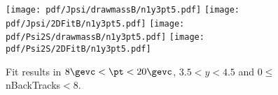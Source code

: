 \begin{figure}[H]
\begin{center}
\texttt{[image: pdf/Jpsi/drawmassB/n1y3pt5.pdf]}
\texttt{[image: pdf/Jpsi/2DFitB/n1y3pt5.pdf]}
\vspace*{-0.5cm}
\texttt{[image: pdf/Psi2S/drawmassB/n1y3pt5.pdf]}
\texttt{[image: pdf/Psi2S/2DFitB/n1y3pt5.pdf]}
\vspace*{-0.5cm}
\end{center}
\caption{Fit results in $8\gevc<\pt<20\gevc$, $3.5<y<4.5$ and 0$\leq$nBackTracks$<$8.}
\label{Fitn1y3pt5}
\end{figure}
